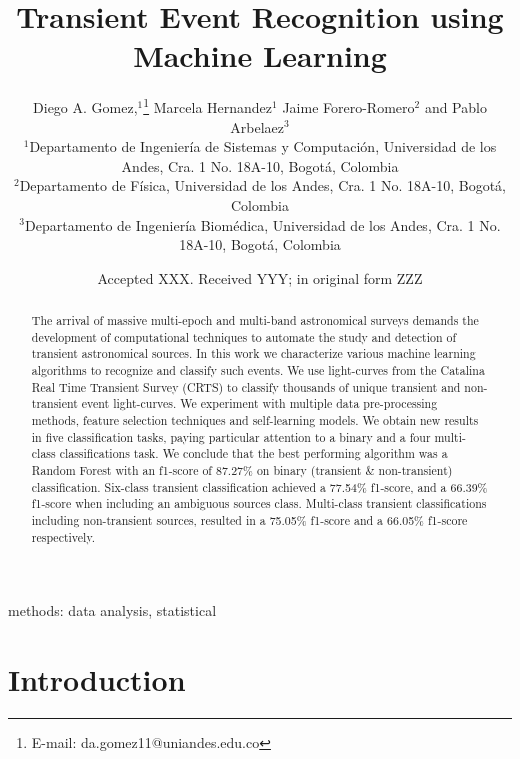 \documentclass[a4paper,fleqn,usenatbib]{mnras}
\title[Transient Event Recognition using Machine Learning]{Transient Event Recognition using Machine Learning}
\author[Diego. A. Gomez et al.]{
Diego A. Gomez,$^{1}$\thanks{E-mail: da.gomez11@uniandes.edu.co}
Marcela Hernandez$^{1}$   
Jaime Forero-Romero$^{2}$
and Pablo Arbelaez$^{3}$
\\
$^{1}$Departamento de Ingenier\'ia de Sistemas y Computaci\'on, Universidad de los Andes, Cra. 1 No. 18A-10, Bogot\'a, Colombia\\
$^{2}$Departamento de F\'isica, Universidad de los Andes, Cra. 1 No. 18A-10, Bogot\'a, Colombia\\
$^{3}$Departamento de Ingenier\'ia Biom\'edica, Universidad de los Andes, Cra. 1 No. 18A-10, Bogot\'a, Colombia
}
\date{Accepted XXX. Received YYY; in original form ZZZ}
\begin{document}
\label{firstpage}
\pagerange{\pageref{firstpage}--\pageref{lastpage}}
\maketitle

\begin{abstract}




The arrival of massive multi-epoch and multi-band astronomical surveys
demands the development of computational techniques to automate the
study and detection of transient astronomical sources. 
In this work we characterize various machine learning algorithms to
recognize and classify such events.
We use light-curves from the Catalina Real Time Transient Survey
(CRTS) to classify thousands of unique transient and non-transient
event light-curves.
We experiment  with multiple data pre-processing methods,
feature selection techniques and self-learning models. 
We obtain new results in five classification tasks, paying particular
attention to a binary and a four multi-class classifications task.  
We conclude that the best performing algorithm was
a Random Forest with an f1-score of 87.27\% on binary
(transient \& non-transient) classification. 
Six-class transient classification achieved a 77.54\% f1-score, and a
66.39\% f1-score when including an ambiguous sources class.
Multi-class transient classifications including non-transient sources,
resulted in a 75.05\% f1-score and a 66.05\% f1-score respectively.  

\end{abstract}

\begin{keywords}
methods: data analysis, statistical
\end{keywords}



\section{Introduction}
\end{document}
